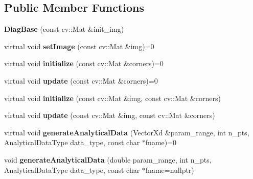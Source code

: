 \subsection*{Public Member Functions}
\begin{DoxyCompactItemize}
\item 
\hypertarget{classDiagBase_a0f5852709cb03bc86b5fca81f0483325}{{\bfseries Diag\-Base} (const cv\-::\-Mat \&init\-\_\-img)}\label{classDiagBase_a0f5852709cb03bc86b5fca81f0483325}

\item 
\hypertarget{classDiagBase_ab26161b77dd7a9161f8945f761feb61c}{virtual void {\bfseries set\-Image} (const cv\-::\-Mat \&img)=0}\label{classDiagBase_ab26161b77dd7a9161f8945f761feb61c}

\item 
\hypertarget{classDiagBase_a3a1cf2490a7647027c0f86e80c43bb03}{virtual void {\bfseries initialize} (const cv\-::\-Mat \&corners)=0}\label{classDiagBase_a3a1cf2490a7647027c0f86e80c43bb03}

\item 
\hypertarget{classDiagBase_ae1eb9474a09592e6daf0f0a776bf678f}{virtual void {\bfseries update} (const cv\-::\-Mat \&corners)=0}\label{classDiagBase_ae1eb9474a09592e6daf0f0a776bf678f}

\item 
\hypertarget{classDiagBase_acd4b15bf4f6bf3d3092f0a66e781127b}{virtual void {\bfseries initialize} (const cv\-::\-Mat \&img, const cv\-::\-Mat \&corners)}\label{classDiagBase_acd4b15bf4f6bf3d3092f0a66e781127b}

\item 
\hypertarget{classDiagBase_a1dda6929b6f96ce23581a379ad9c2d59}{virtual void {\bfseries update} (const cv\-::\-Mat \&img, const cv\-::\-Mat \&corners)}\label{classDiagBase_a1dda6929b6f96ce23581a379ad9c2d59}

\item 
\hypertarget{classDiagBase_a2ec31e3a577a7f2388b4dfaf5e1ed899}{virtual void {\bfseries generate\-Analytical\-Data} (Vector\-Xd \&param\-\_\-range, int n\-\_\-pts, Analytical\-Data\-Type data\-\_\-type, const char $\ast$fname)=0}\label{classDiagBase_a2ec31e3a577a7f2388b4dfaf5e1ed899}

\item 
\hypertarget{classDiagBase_a663aa4697855857c281ead3acdc2c04d}{void {\bfseries generate\-Analytical\-Data} (double param\-\_\-range, int n\-\_\-pts, Analytical\-Data\-Type data\-\_\-type, const char $\ast$fname=nullptr)}\label{classDiagBase_a663aa4697855857c281ead3acdc2c04d}


\end{DoxyCompactItemize}
